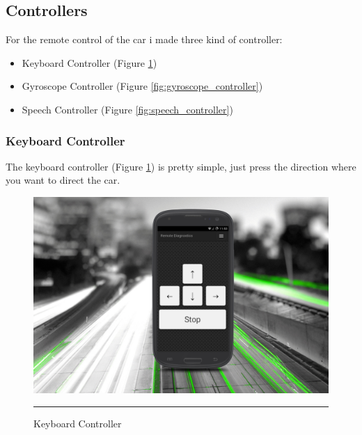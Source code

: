 \subsection{Controllers}
For the remote control of the car i made three kind of controller:
\begin{itemize}
  \item Keyboard Controller (Figure \ref{fig:keyboard_controller})
  \item Gyroscope Controller (Figure \ref{fig:gyroscope_controller}) 
  \item Speech Controller (Figure \ref{fig:speech_controller})
\end{itemize}
\subsubsection{Keyboard Controller}
The keyboard controller (Figure \ref{fig:keyboard_controller}) is pretty simple, just press the direction where you want to direct the car.
\begin{figure}[h!]
  \centering
    \includegraphics[width=1\textwidth]{./Pictures/keyboard_controller.jpg}
  \rule{1\textwidth}{1pt}
 \caption{Keyboard Controller}
 \label{fig:keyboard_controller}
\end{figure}
